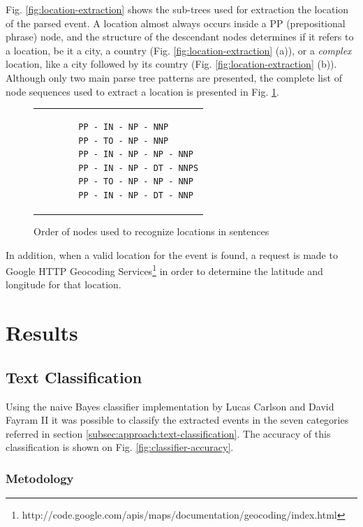 \documentclass{llncs}
\begin{document}
Fig. \ref{fig:location-extraction} shows the sub-trees used for extraction the location of the parsed event. A location almost always occurs inside a PP (prepositional phrase) node, and the structure of the descendant nodes determines if it refers to a location, be it a city, a country (Fig. \ref{fig:location-extraction} (a)), or a \textit{complex} location, like a city followed by its country (Fig. \ref{fig:location-extraction} (b)). Although only two main parse tree patterns are presented, the complete list of node sequences used to extract a location is presented in Fig. \ref{fig:nodes-order}.

\begin{figure}[h!]
	\centering
	\begin{tabular}{p{4cm}}
		\begin{verbatim}
		PP - IN - NP - NNP
		PP - TO - NP - NNP
		PP - IN - NP - NP - NNP
		PP - IN - NP - DT - NNPS
		PP - TO - NP - NP - NNP
		PP - IN - NP - DT - NNP
		\end{verbatim}
	\end{tabular}
	\caption{Order of nodes used to recognize locations in sentences}
	\label{fig:nodes-order}
\end{figure}

In addition, when a valid location for the event is found, a request is made to Google HTTP Geocoding Services\footnote{http://code.google.com/apis/maps/documentation/geocoding/index.html} in order to determine the latitude and longitude for that location.

\section{Results}

\subsection{Text Classification}

Using the naive Bayes classifier implementation by Lucas Carlson and David Fayram II\cite{classifier} it was possible to classify the extracted events in the seven categories referred in section \ref{subsec:approach:text-classification}. The accuracy of this classification is shown on Fig. \ref{fig:classifier-accuracy}.

\subsubsection{Metodology}
\end{document}
